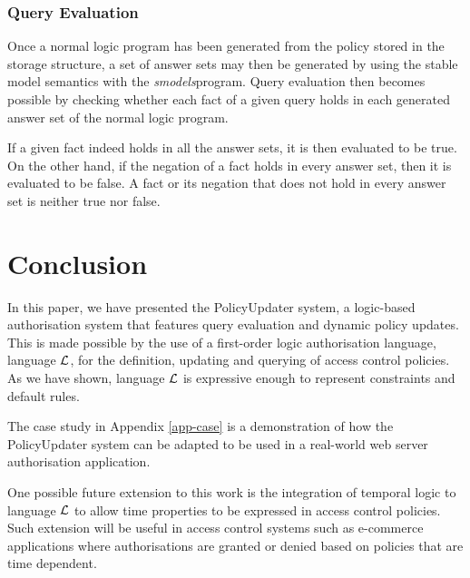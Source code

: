 \documentclass[11pt, twocolumn]{article}
\begin{document}
      \subsubsection{Query Evaluation}

        Once a normal logic program has been generated from the policy stored
        in the storage structure, a set of answer sets may then be generated
        by using the stable model semantics \cite{SIM} with the
        {\em smodels}\footnotemark program. Query evaluation then becomes
        possible by checking whether each fact of a given query holds in each
        generated answer set of the normal logic program.


        If a given fact indeed holds in all the answer sets, it is then
        evaluated to be true. On the other hand, if the negation of a fact
        holds in every answer set, then it is evaluated to be false. A fact
        or its negation that does not hold in every answer set is neither true
        nor false.

  \section{Conclusion}
    \label{sec-conclusion}

    In this paper, we have presented the PolicyUpdater system, a logic-based
    authorisation system that features query evaluation and dynamic policy
    updates. This is made possible by the use of a first-order logic
    authorisation language, language ${\cal L}$, for the definition, updating
    and querying of access control policies. As we have shown, language
    ${\cal L}$ is expressive enough to represent constraints and default rules.

    The case study in Appendix \ref{app-case} is a demonstration of how the
    PolicyUpdater system can be adapted to be used in a real-world web server
    authorisation application.

    One possible future extension to this work is the integration of temporal
    logic to language ${\cal L}$ to allow time properties to be expressed in
    access control policies. Such extension will be useful in access control
    systems such as e-commerce applications where authorisations are granted
    or denied based on policies that are time dependent.

  \newpage
  \appendix
\end{document}
